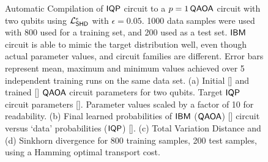 \begin{figure}[ht]
\begin{subfigure}[t]{0.27\textwidth}
    \caption{}
    \label{subfig:auto_comp_sink_2_supp}
\end{subfigure}
\caption{Automatic Compilation of $\operatorname{\textsf{IQP}}$ circuit to a $p = 1 \operatorname{\textsf{QAOA}}$ circuit with two qubits using $\mathcal{L}_{\operatorname{\textsf{SHD}}}^\epsilon$ with $\epsilon = 0.05$. 1000 data samples were used with 800 used for a training set, and 200 used as a test set. $\textsf{IBM}$ circuit is able to mimic the target distribution well, even though actual parameter values, and circuit families are different. Error bars represent mean, maximum and minimum values achieved over 5 independent training runs on the same data set. (a) Initial [\crule[cyan]{0.2cm}{0.2cm}] and trained [\crule[Lavender]{0.2cm}{0.2cm}] $\operatorname{\textsf{QAOA}}$ circuit parameters for two qubits. Target $\operatorname{\textsf{IQP}}$ circuit parameters [\crule[green]{0.2cm}{0.2cm}]. Parameter values scaled by a factor of 10 for readability. (b) Final learned probabilities of $\textsf{IBM}$ ($\operatorname{\textsf{QAOA}}$) [\crule[blue]{0.2cm}{0.2cm}] circuit versus `data' probabilities ($\operatorname{\textsf{IQP}}$) [\crule[black]{0.2cm}{0.2cm}]. (c) Total Variation Distance and (d) Sinkhorn divergence for 800 training samples, 200 test samples, using a Hamming optimal transport cost.}\label{fig:autocompilationtwoqubits}
\end{figure}



